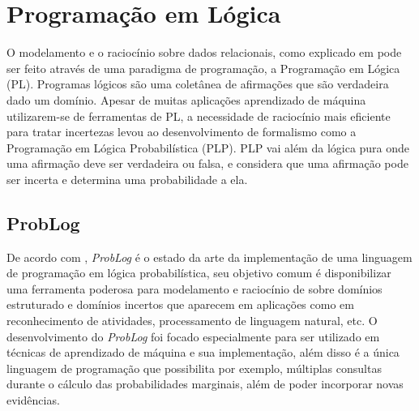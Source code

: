 \documentclass[
	12pt,				%
    oneside,			%
	a4paper,			%
	english,			%
	french,				%
	spanish,			%
	brazil,				%
	]{abntex2}
\begin{document}












\newpage
\section {Programação em Lógica}
 O modelamento e o raciocínio sobre dados relacionais, como explicado em  pode ser feito através de uma paradigma de programação, a Programação em Lógica (PL). Programas lógicos são uma coletânea de afirmações que são verdadeira dado um domínio. Apesar de muitas aplicações aprendizado de máquina utilizarem-se de ferramentas de PL, a necessidade de raciocínio mais eficiente para tratar incertezas levou ao desenvolvimento de formalismo como a Programação em Lógica Probabilística (PLP). PLP vai além da lógica pura onde uma afirmação deve ser verdadeira ou falsa, e considera que uma afirmação pode ser incerta e determina uma probabilidade a ela.


\subsection{ProbLog}

De acordo com , \textit{ProbLog} é o estado da arte da implementação de uma linguagem de programação em lógica probabilística, seu objetivo comum é disponibilizar uma ferramenta poderosa para modelamento e raciocínio de sobre domínios estruturado e domínios incertos que aparecem em aplicações como em reconhecimento de atividades, processamento de linguagem natural, etc. O desenvolvimento do \textit{ProbLog} foi focado especialmente para ser utilizado em técnicas de aprendizado de máquina e sua implementação, além disso é a única linguagem de programação que possibilita por exemplo, múltiplas consultas durante o cálculo das probabilidades marginais, além de poder incorporar novas evidências.
\end{document}
